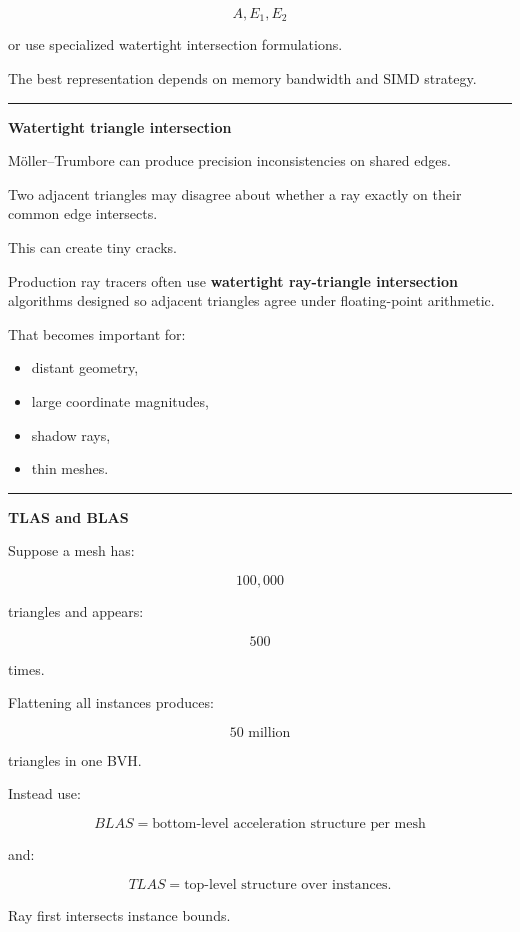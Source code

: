 \[
A,
E_1,E_2
\]

or use specialized watertight intersection formulations.

The best representation depends on memory bandwidth and SIMD strategy.

\begin{center}\rule{0.5\linewidth}{0.5pt}\end{center}

\textbf{Watertight triangle intersection}

Möller--Trumbore can produce precision inconsistencies on shared edges.

Two adjacent triangles may disagree about whether a ray exactly on their common edge intersects.

This can create tiny cracks.

Production ray tracers often use \textbf{watertight ray-triangle intersection} algorithms designed so adjacent triangles agree under floating-point arithmetic.

That becomes important for:

\begin{itemize}
\tightlist
\item
  distant geometry,
\item
  large coordinate magnitudes,
\item
  shadow rays,
\item
  thin meshes.
\end{itemize}

\begin{center}\rule{0.5\linewidth}{0.5pt}\end{center}

\textbf{TLAS and BLAS}

Suppose a mesh has:

\[
100,000
\]

triangles and appears:

\[
500
\]

times.

Flattening all instances produces:

\[
50\text{ million}
\]

triangles in one BVH.

Instead use:

\[
\boxed{
BLAS=\text{bottom-level acceleration structure per mesh}
}
\]

and:

\[
\boxed{
TLAS=\text{top-level structure over instances}.
}
\]

Ray first intersects instance bounds.

